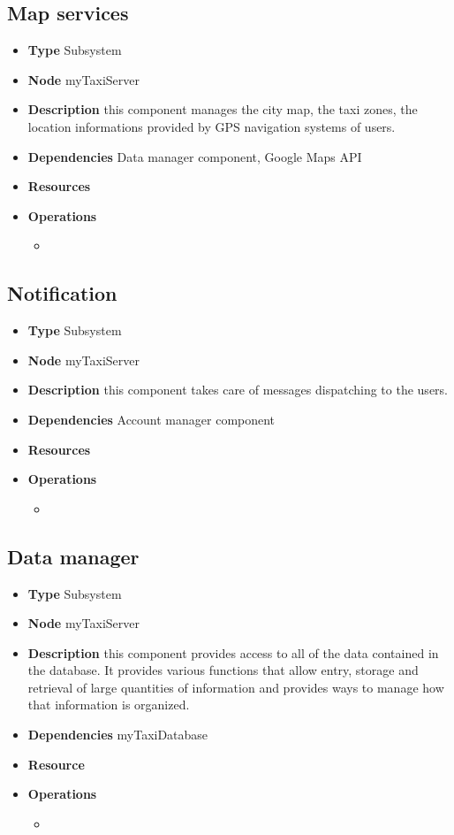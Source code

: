 \subsection{Map services}
\begin{itemize}
	\item[]\textbf{Type} Subsystem
	\item[]\textbf{Node} myTaxiServer
	\item[]\textbf{Description} this component manages the city map, the taxi zones, the location informations provided by GPS navigation systems of users.
	\item[]\textbf{Dependencies} Data manager component, Google Maps API
	\item[]\textbf{Resources} 
	\item[]\textbf{Operations}\begin{itemize}
		\item
	\end{itemize}
\end{itemize}

\subsection{Notification}
\begin{itemize}
	\item[]\textbf{Type} Subsystem
	\item[]\textbf{Node} myTaxiServer
	\item[]\textbf{Description}  this component takes care of messages dispatching to the users.
	\item[]\textbf{Dependencies} Account manager component
	\item[]\textbf{Resources} 
	\item[]\textbf{Operations}\begin{itemize}
		\item
	\end{itemize}
\end{itemize}

\subsection{Data manager}
\begin{itemize}
	\item[]\textbf{Type} Subsystem
	\item[]\textbf{Node} myTaxiServer
	\item[]\textbf{Description}  this component provides access to all of the data contained in the database. It provides various functions that allow entry, storage and retrieval of large quantities of information and provides ways to manage how that information is organized.
	\item[]\textbf{Dependencies} myTaxiDatabase
	\item[]\textbf{Resource} 
	\item[]\textbf{Operations}\begin{itemize}
		\item
	\end{itemize}
\end{itemize}

